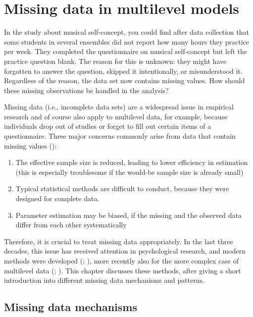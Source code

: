 \documentclass[
  letterpaper,
  11pt,
  english,
  singlespacing,
  headsepline,
  openany]{MastersDoctoralThesis}
\providecommand{\tightlist}{%
  \setlength{\itemsep}{0pt}\setlength{\parskip}{0pt}}
\begin{document}
\section{Missing data in multilevel
models}\label{missing-data-in-multilevel-models}

In the study about musical self-concept, you could find after data
collection that some students in several ensembles did not report how
many hours they practice per week. They completed the questionnaire on
musical self-concept but left the practice question blank. The reason
for this is unknown: they might have forgotten to answer the question,
skipped it intentionally, or misunderstood it. Regardless of the reason,
the data set now contains missing values. How should these missing
observations be handled in the analysis?

Missing data (i.e., incomplete data sets) are a widespread issue in
empirical research and of course also apply to multilevel data, for
example, because individuals drop out of studies or forget to fill out
certain items of a questionnaire. Three major concerns commonly arise
from data that contain missing values ():

\begin{enumerate}
\def\labelenumi{\arabic{enumi}.}
\tightlist
\item
  The effective sample size is reduced, leading to lower efficiency in
  estimation (this is especially troublesome if the would-be sample size
  is already small)
\item
  Typical statistical methods are difficult to conduct, because they
  were designed for complete data.
\item
  Parameter estimation may be biased, if the missing and the observed
  data differ from each other systematically
\end{enumerate}

Therefore, it is crucial to treat missing data appropriately. In the
last three decades, this issue has received attention in psychological
research, and modern methods were developed
(; ), more recently also for the more complex case of
multilevel data (;
). This chapter discusses
these methods, after giving a short introduction into different missing
data mechanisms and patterns.

\subsection{Missing data mechanisms}\label{missing-data-mechanisms}
\end{document}
